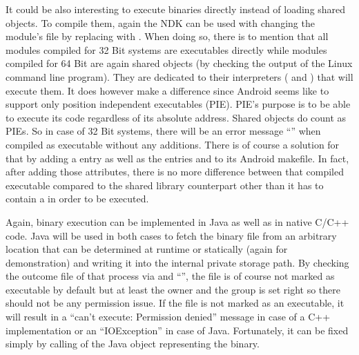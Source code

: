 It could be also interesting to execute binaries directly instead of loading shared objects. To compile them, again the NDK can be used with changing the module's
 file by replacing  with 
. When doing so, there is to mention 
that all modules compiled for 32 Bit systems are executables directly while modules
compiled for 64 Bit are again shared objects (by checking the output of the Linux
 command line program).
They are dedicated to their interpreters ( and ) that will execute them. It does however make a difference since
Android seems like to support only position independent executables (PIE).
PIE's purpose is to be able to execute its code regardless of its absolute address. Shared objects do count as PIEs. So in case of 32 Bit systems, there will be an
error message 
``'' when
compiled as executable without any additions. There is of course a solution for that
by adding a  entry  as well as the 
entries  and  to its Android makefile. In fact, after adding
those attributes, there is no more difference between that compiled executable 
compared to the shared library counterpart other than it has to contain a
 in order to be executed. 

Again, binary execution can be implemented in Java as well as in native C/C++ code.
Java will be used in both cases to fetch the binary file from an arbitrary location that can be determined at runtime or statically (again  
for demonstration) and writing it into the internal private storage path. By checking the outcome file of that process via  and ``'', the file is of course not marked as executable by default but at least the owner and the group is set right so there
should not be any permission issue.
If the file is not marked as an executable, it will result in a ``can't execute: Permission denied'' message in case of a C++ implementation or an ``IOException'' in case of Java. Fortunately, it can be fixed simply by calling 
of the Java  object representing the binary. 

